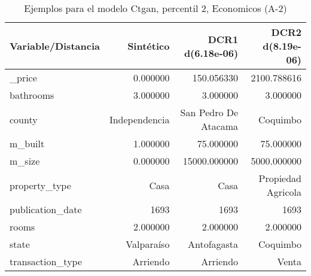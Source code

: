 \begin{table}[H]
\centering
\fontsize{10}{14}\selectfont
\caption{Ejemplos para el modelo Ctgan, percentil 2, Economicos (A-2)}
\label{table-example-economicos-a-2-ctgan-2p}
\begin{tabular}{|l|r|r|r|}
\hline
\rowcolor[gray]{0.8}
Variable/Distancia & Sintético & DCR1 d(6.18e-06) & DCR2 d(8.19e-06) \\
\hline \_price & \cellcolor[rgb]{0.9, 0.54, 0.52} 0.000000 & 150.056330 & 2100.788616 \\
\hline bathrooms & \cellcolor[rgb]{0.9, 0.54, 0.52} 3.000000 & \cellcolor[rgb]{0.9, 0.54, 0.52} 3.000000 & \cellcolor[rgb]{0.9, 0.54, 0.52} 3.000000 \\
\hline county & \cellcolor[rgb]{0.9, 0.54, 0.52} Independencia & San Pedro De Atacama & Coquimbo \\
\hline m\_built & \cellcolor[rgb]{0.9, 0.54, 0.52} 1.000000 & 75.000000 & 75.000000 \\
\hline m\_size & \cellcolor[rgb]{0.9, 0.54, 0.52} 0.000000 & 15000.000000 & 5000.000000 \\
\hline property\_type & \cellcolor[rgb]{0.9, 0.54, 0.52} Casa & \cellcolor[rgb]{0.9, 0.54, 0.52} Casa & Propiedad Agricola \\
\hline publication\_date & \cellcolor[rgb]{0.9, 0.54, 0.52} 1693 & \cellcolor[rgb]{0.9, 0.54, 0.52} 1693 & \cellcolor[rgb]{0.9, 0.54, 0.52} 1693 \\
\hline rooms & \cellcolor[rgb]{0.9, 0.54, 0.52} 2.000000 & \cellcolor[rgb]{0.9, 0.54, 0.52} 2.000000 & \cellcolor[rgb]{0.9, 0.54, 0.52} 2.000000 \\
\hline state & \cellcolor[rgb]{0.9, 0.54, 0.52} Valparaíso & Antofagasta & Coquimbo \\
\hline transaction\_type & \cellcolor[rgb]{0.9, 0.54, 0.52} Arriendo & \cellcolor[rgb]{0.9, 0.54, 0.52} Arriendo & Venta \\
\hline
\end{tabular}
\end{table}
